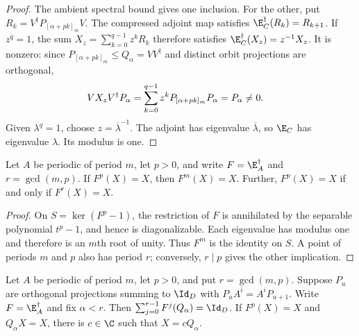 \begin{proof}\leanok
    The ambient spectral bound gives one inclusion. For the other, put
    $R_k=V^\dagger P_{[\alpha+pk]_m}V$. The compressed adjoint map satisfies
    $\E_C^\dagger(R_k)=R_{k+1}$. If $z^q=1$, the sum
    $X_z=\sum_{k=0}^{q-1}z^kR_k$ therefore satisfies
    $\E_C^\dagger(X_z)=z^{-1}X_z$. It is nonzero: since
    $P_{[\alpha+pk]_m}\le Q_\alpha=VV^\dagger$ and distinct orbit projections
    are orthogonal,
    \begin{align}
        VX_zV^\dagger P_\alpha & =\sum_{k=0}^{q-1}z^kP_{[\alpha+pk]_m}P_\alpha=P_\alpha\ne0. \notag
    \end{align}
    Given $\lambda^q=1$, choose $z=\overline{\lambda}^{-1}$.
    The adjoint has eigenvalue $\overline{\lambda}$, so $\E_C$ has
    eigenvalue $\lambda$. Its modulus is one.
\end{proof}

\begin{lemma}
    \label{thm:periodic_adjoint_fixed_gcd}
    \leanok
    Let $A$ be periodic of period $m$, let $p>0$, and write
    $F=\E_A^\dagger$ and $r=\gcd(m,p)$. If $F^p(X)=X$, then $F^m(X)=X$.
    Further, $F^p(X)=X$ if and only if $F^r(X)=X$.
\end{lemma}

\begin{proof}\leanok
    On $S=\ker(F^p-1)$, the restriction of $F$ is annihilated by the
    separable polynomial $t^p-1$, and hence is diagonalizable.
    Each eigenvalue has modulus one and therefore is an $m$th root
    of unity. Thus $F^m$ is the identity on $S$.
    A point of periods $m$ and $p$ also has period $r$; conversely,
    $r\mid p$ gives the other implication.
\end{proof}

\begin{lemma}
    \label{thm:periodic_orbit_fixed_rigidity}
    \leanok
    Let $A$ be periodic of period $m$, let $p>0$, and put $r=\gcd(m,p)$.
    Suppose $P_u$ are orthogonal projections summing to $\Id_D$ with
    $P_uA^i=A^iP_{u+1}$. Write $F=\E_A^\dagger$ and fix $\alpha<r$.
    Then $\sum_{j=0}^{r-1}F^j(Q_\alpha)=\Id_D$.
    If $F^p(X)=X$ and $Q_\alpha X=X$, there is $c\in\C$ such that
    $X=cQ_\alpha$.
\end{lemma}

